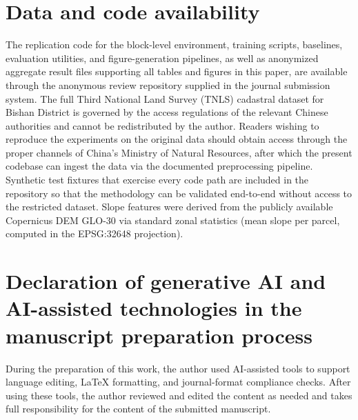 \documentclass[preprint,12pt]{elsarticle}
\begin{document}
\section*{Data and code availability}
The replication code for the block-level environment, training scripts, baselines, evaluation utilities, and figure-generation pipelines, as well as anonymized aggregate result files supporting all tables and figures in this paper, are available through the anonymous review repository supplied in the journal submission system. The full Third National Land Survey (TNLS) cadastral dataset for Bishan District is governed by the access regulations of the relevant Chinese authorities and cannot be redistributed by the author. Readers wishing to reproduce the experiments on the original data should obtain access through the proper channels of China's Ministry of Natural Resources, after which the present codebase can ingest the data via the documented preprocessing pipeline. Synthetic test fixtures that exercise every code path are included in the repository so that the methodology can be validated end-to-end without access to the restricted dataset. Slope features were derived from the publicly available Copernicus DEM GLO-30 \citep{copernicus2021dem} via standard zonal statistics (mean slope per parcel, computed in the EPSG:32648 projection).

\section*{Declaration of generative AI and AI-assisted technologies in the manuscript preparation process}
During the preparation of this work, the author used AI-assisted tools to support language editing, LaTeX formatting, and journal-format compliance checks. After using these tools, the author reviewed and edited the content as needed and takes full responsibility for the content of the submitted manuscript.


\end{document}
